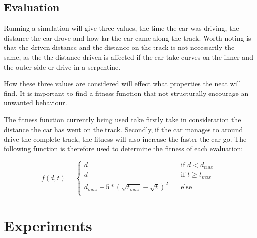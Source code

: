 
\subsection{Evaluation}

Running a simulation will give three values, the time the car was driving, the distance the car drove and how far the car came along the track. Worth noting is that the driven distance and the distance on the track is not necessarily the same, as the the distance driven is affected if the car take curves on the inner and the outer side or drive in a serpentine.

How these three values are considered will effect what properties the neat will find. It is important to find a fitness function that not structurally encourage an unwanted behaviour.

The fitness function currently being used take firstly take in consideration the distance the car has went on the track. Secondly, if the car manages to around drive the complete track, the fitness will also increase the faster the car go. The following function is therefore used to determine the fitness of each evaluation:

\begin{equation}
  f(d, t) =
  \begin{cases}
    d    & \quad \text{if } d < d_{max} \\
    d    & \quad \text{if } t \geq t_{max} \\
    d_{max} + 5*(\sqrt{t_{max}} - \sqrt{t})^2    &\quad \text{else} \\
  \end{cases}
\end{equation}

\section{Experiments}

